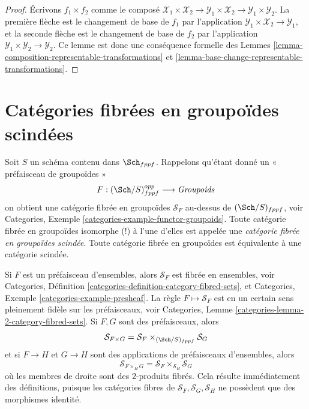 \begin{proof}
Écrivons $f_1 \times f_2$ comme le composé
$\mathcal{X}_1 \times \mathcal{X}_2 \to
\mathcal{Y}_1 \times \mathcal{X}_2 \to
\mathcal{Y}_1 \times \mathcal{Y}_2$.
La première flèche est le changement de base de $f_1$ par l'application
$\mathcal{Y}_1 \times \mathcal{X}_2 \to \mathcal{Y}_1$, et la seconde flèche
est le changement de base de $f_2$ par l'application
$\mathcal{Y}_1 \times \mathcal{Y}_2 \to \mathcal{Y}_2$.
Ce lemme est donc une conséquence formelle des Lemmes
\ref{lemma-composition-representable-transformations}
et \ref{lemma-base-change-representable-transformations}.
\end{proof}



\section{Catégories fibrées en groupoïdes scindées}
\label{section-split}

\noindent
Soit $S$ un schéma contenu dans $\Sch_{fppf}$.
Rappelons qu'étant donné un « préfaisceau de groupoïdes »
$$
F : (\Sch/S)_{fppf}^{opp} \longrightarrow \textit{Groupoids}
$$
on obtient une catégorie fibrée en groupoïdes $\mathcal{S}_F$ au-dessus de
$(\Sch/S)_{fppf}$, voir
Categories, Exemple \ref{categories-example-functor-groupoids}.
Toute catégorie fibrée en groupoïdes isomorphe (!) à l'une d'elles
est appelée une {\it catégorie fibrée en groupoïdes scindée}.
Toute catégorie fibrée en groupoïdes est équivalente à une catégorie scindée.

\medskip\noindent
Si $F$ est un préfaisceau d'ensembles, alors $\mathcal{S}_F$ est
fibrée en ensembles, voir
Categories,
Définition \ref{categories-definition-category-fibred-sets},
et
Categories, Exemple \ref{categories-example-presheaf}.
La règle $F \mapsto \mathcal{S}_F$ est en un certain sens pleinement fidèle
sur les préfaisceaux, voir
Categories, Lemme \ref{categories-lemma-2-category-fibred-sets}.
Si $F, G$ sont des préfaisceaux, alors
$$
\mathcal{S}_{F \times G}
=
\mathcal{S}_F \times_{(\Sch/S)_{fppf}} \mathcal{S}_G
$$
et si $F \to H$ et $G \to H$ sont des applications de préfaisceaux d'ensembles, alors
$$
\mathcal{S}_{F \times_H G} =
\mathcal{S}_F \times_{\mathcal{S}_H} \mathcal{S}_G
$$
où les membres de droite sont des $2$-produits fibrés. Cela résulte immédiatement
des définitions, puisque les catégories fibres de
$\mathcal{S}_F, \mathcal{S}_G, \mathcal{S}_H$ ne possèdent que des morphismes identité.

